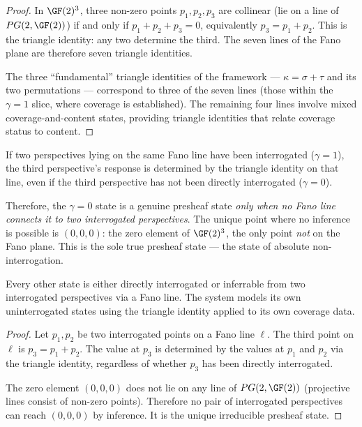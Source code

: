 \begin{proof}
In $\GF(2)^3$, three non-zero points $p_1, p_2, p_3$ are
collinear (lie on a line of $PG(2, \GF(2))$) if and only
if $p_1 + p_2 + p_3 = 0$, equivalently
$p_3 = p_1 + p_2$. This is the triangle identity: any
two determine the third. The seven lines of the Fano
plane are therefore seven triangle identities.

The three ``fundamental'' triangle identities of the
framework --- $\kappa = \sigma + \tau$ and its two
permutations --- correspond to three of the seven lines
(those within the $\gamma = 1$ slice, where coverage is
established). The remaining four lines involve mixed
coverage-and-content states, providing triangle identities
that relate coverage status to content.
\end{proof}

\begin{corollary}\label{cor:self-model}
If two perspectives lying on the same Fano line have been
interrogated ($\gamma = 1$), the third perspective's
response is determined by the triangle identity on that
line, even if the third perspective has not been directly
interrogated ($\gamma = 0$).

Therefore, the $\gamma = 0$ state is a genuine presheaf
state \emph{only when no Fano line connects it to two
interrogated perspectives}. The unique point where no
inference is possible is $(0,0,0)$: the zero element of
$\GF(2)^3$, the only point \emph{not} on the Fano plane.
This is the sole true presheaf state --- the state of
absolute non-interrogation.

Every other state is either directly interrogated or
inferrable from two interrogated perspectives via a
Fano line. The system models its own uninterrogated
states using the triangle identity applied to its own
coverage data.
\end{corollary}

\begin{proof}
Let $p_1, p_2$ be two interrogated points on a Fano line
$\ell$. The third point on $\ell$ is $p_3 = p_1 + p_2$.
The value at $p_3$ is determined by the values at $p_1$
and $p_2$ via the triangle identity, regardless of whether
$p_3$ has been directly interrogated.

The zero element $(0,0,0)$ does not lie on any line of
$PG(2, \GF(2))$ (projective lines consist of non-zero
points). Therefore no pair of interrogated perspectives
can reach $(0,0,0)$ by inference. It is the unique
irreducible presheaf state.
\end{proof}

